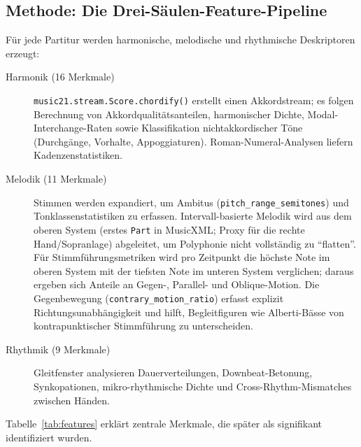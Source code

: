 \documentclass[12pt,a4paper]{article}
\theoremstyle{definition}
\begin{document}
\subsection{Methode: Die Drei-Säulen-Feature-Pipeline}
Für jede Partitur werden harmonische, melodische und rhythmische Deskriptoren erzeugt:

\begin{description}
    \item[Harmonik (16 Merkmale)] \texttt{music21.stream.Score.chordify()} erstellt einen Akkordstream; es folgen Berechnung von Akkordqualitätsanteilen, harmonischer Dichte, Modal-Interchange-Raten sowie Klassifikation nichtakkordischer Töne (Durchgänge, Vorhalte, Appoggiaturen). Roman-Numeral-Analysen liefern Kadenzenstatistiken.
    \item[Melodik (11 Merkmale)] Stimmen werden expandiert, um Ambitus (\texttt{pitch\_range\_semitones}) und Tonklassenstatistiken zu erfassen. Intervall-basierte Melodik wird aus dem oberen System (erstes \texttt{Part} in MusicXML; Proxy für die rechte Hand/Sopranlage) abgeleitet, um Polyphonie nicht vollständig zu \enquote{flatten}. Für Stimmführungsmetriken wird pro Zeitpunkt die höchste Note im oberen System mit der tiefsten Note im unteren System verglichen; daraus ergeben sich Anteile an Gegen-, Parallel- und Oblique-Motion. Die Gegenbewegung (\texttt{contrary\_motion\_ratio}) erfasst explizit Richtungsunabhängigkeit und hilft, Begleitfiguren wie Alberti-Bässe von kontrapunktischer Stimmführung zu unterscheiden.
    \item[Rhythmik (9 Merkmale)] Gleitfenster analysieren Dauerverteilungen, Downbeat-Betonung, Synkopationen, mikro-rhythmische Dichte und Cross-Rhythm-Mismatches zwischen Händen.
\end{description}

Tabelle~\ref{tab:features} erklärt zentrale Merkmale, die später als signifikant identifiziert wurden.
\end{document}
